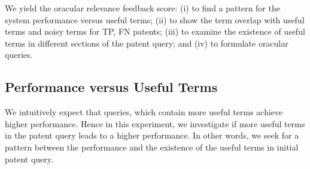 We yield the oracular relevance feedback score: (i) to find a pattern for the system performance versus useful terms; (ii) to show the term overlap with useful terms and noisy terms for TP, FN patents; (iii) to examine the existence of useful terms in different sections of the patent query; and (iv) to formulate oracular queries.
\subsection{Performance versus Useful Terms}
\label{PerformanceUsefulTerms}
We intuitively expect that queries, which contain more useful terms achieve higher performance. Hence in this experiment,
we investigate if more useful terms in the patent query leads to a higher performance. In other words, we seek for a pattern 
between the performance and the existence of the useful terms in initial patent query. 

